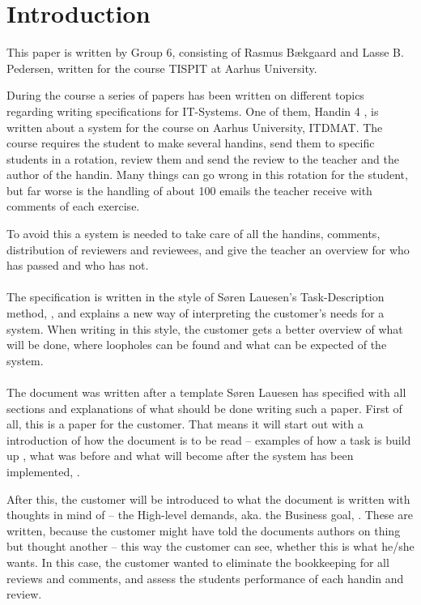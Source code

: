 \documentclass[Main]{subfiles}
\begin{document}
\section{Introduction}


This paper is written by Group 6, consisting of Rasmus Bækgaard and Lasse B. Pedersen, written for the course TISPIT at Aarhus University.


During the course a series of papers has been written on different topics regarding writing specifications for IT-Systems.
One of them, Handin 4 \parencite{HI4}, is written about a system for the course on Aarhus University, ITDMAT. 
The course requires the student to make several handins, send them to specific students in a rotation, review them and send the review to the teacher and the author of the handin.
Many things can go wrong in this rotation for the student, but far worse is the handling of about 100 emails the teacher receive with comments of each exercise.

To avoid this a system is needed to take care of all the handins, comments, distribution of reviewers and reviewees, and give the teacher an overview for who has passed and who has not.
\\
\\
The specification is written in the style of Søren Lauesen's Task-Description method, \parencite{Task}, and explains a new way of interpreting the customer's needs for a system.
When writing in this style, the customer gets a better overview of what will be done, where loopholes can be found and what can be expected of the system.
\\
\\
The document was written after a template Søren Lauesen has specified with all sections and explanations of what should be done writing such a paper.
First of all, this is a paper for the customer.
That means it will start out with a introduction of how the document is to be read -- examples of how a task is build up \parencite[5-6]{HI4}, what was before and what will become after the system has been implemented, \parencite[4]{HI4}.

After this, the customer will be introduced to what the document is written with thoughts in mind of -- the High-level demands, aka. the Business goal, \parencite[7]{HI4}. 
These are written, because the customer might have told the documents authors on thing but thought another -- this way the customer can see, whether this is what he/she wants.
In this case, the customer wanted to eliminate the bookkeeping for all reviews and comments, and assess the students performance of each handin and review.
\end{document}
